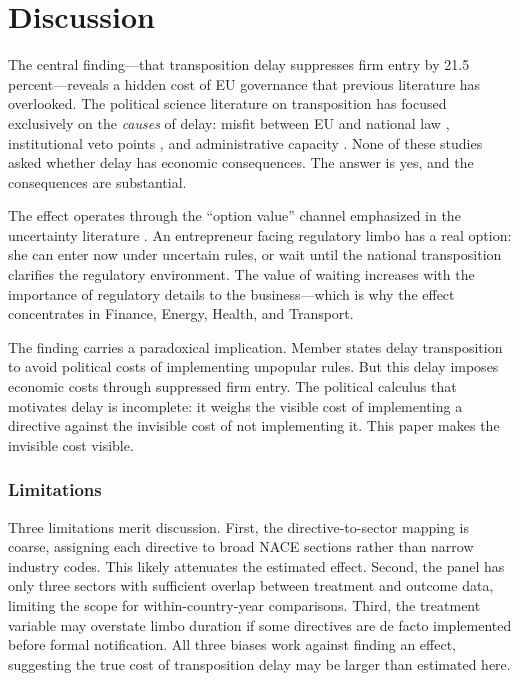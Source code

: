\documentclass[12pt]{article}
\begin{document}



\section{Discussion}
\label{sec:discussion}

The central finding---that transposition delay suppresses firm entry by 21.5 percent---reveals a hidden cost of EU governance that previous literature has overlooked. The political science literature on transposition has focused exclusively on the \textit{causes} of delay: misfit between EU and national law \citep{mastenbroek2003}, institutional veto points \citep{konig2006}, and administrative capacity \citep{falkner2004}. None of these studies asked whether delay has economic consequences. The answer is yes, and the consequences are substantial.

The effect operates through the ``option value'' channel emphasized in the uncertainty literature \citep{bloom2007, handley2015}. An entrepreneur facing regulatory limbo has a real option: she can enter now under uncertain rules, or wait until the national transposition clarifies the regulatory environment. The value of waiting increases with the importance of regulatory details to the business---which is why the effect concentrates in Finance, Energy, Health, and Transport.

The finding carries a paradoxical implication. Member states delay transposition to avoid political costs of implementing unpopular rules. But this delay imposes economic costs through suppressed firm entry. The political calculus that motivates delay is incomplete: it weighs the visible cost of implementing a directive against the invisible cost of not implementing it. This paper makes the invisible cost visible.

\subsubsection*{Limitations} Three limitations merit discussion. First, the directive-to-sector mapping is coarse, assigning each directive to broad NACE sections rather than narrow industry codes. This likely attenuates the estimated effect. Second, the panel has only three sectors with sufficient overlap between treatment and outcome data, limiting the scope for within-country-year comparisons. Third, the treatment variable may overstate limbo duration if some directives are de facto implemented before formal notification. All three biases work against finding an effect, suggesting the true cost of transposition delay may be larger than estimated here.
\end{document}

